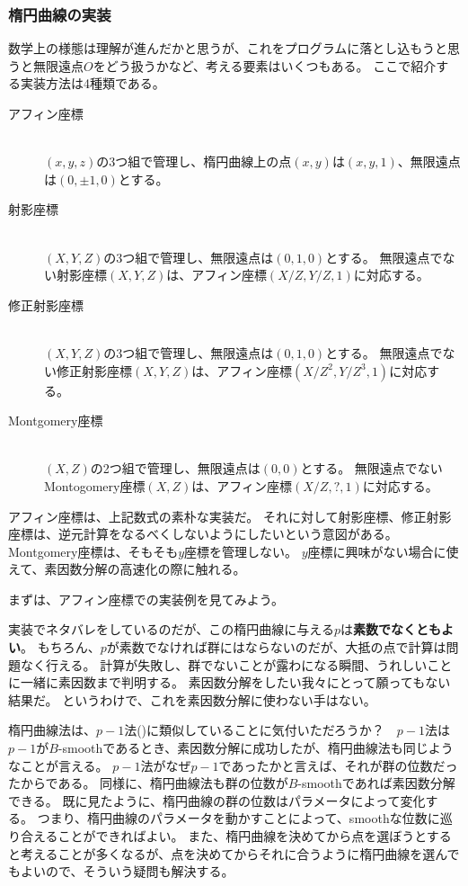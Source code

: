 \subsubsection{楕円曲線の実装}
数学上の様態は理解が進んだかと思うが、これをプログラムに落とし込もうと思うと無限遠点$O$をどう扱うかなど、考える要素はいくつもある。
ここで紹介する実装方法は4種類である。
\begin{description}
 \item [アフィン座標]\mbox{}\\
       $(x,y,z)$の3つ組で管理し、楕円曲線上の点$(x,y)$は$(x,y,1)$、無限遠点は$(0,\pm1,0)$とする。
 \item [射影座標]\mbox{}\\
       $(X,Y,Z)$の3つ組で管理し、無限遠点は$(0,1,0)$とする。
       無限遠点でない射影座標$(X,Y,Z)$は、アフィン座標$(X/Z,Y/Z,1)$に対応する。
 \item [修正射影座標]\mbox{}\\
       $(X,Y,Z)$の3つ組で管理し、無限遠点は$(0,1,0)$とする。
       無限遠点でない修正射影座標$(X,Y,Z)$は、アフィン座標$(X/Z^2,Y/Z^3,1)$に対応する。
 \item [Montgomery座標]\mbox{}\\
       $(X,Z)$の2つ組で管理し、無限遠点は$(0,0)$とする。
       無限遠点でないMontogomery座標$(X,Z)$は、アフィン座標$(X/Z,?,1)$に対応する。
\end{description}
アフィン座標は、上記数式の素朴な実装だ。
それに対して射影座標、修正射影座標は、逆元計算をなるべくしないようにしたいという意図がある。
Montgomery座標は、そもそも$y$座標を管理しない。
$y$座標に興味がない場合に使えて、素因数分解の高速化の際に触れる。

まずは、アフィン座標での実装例を見てみよう。


実装でネタバレをしているのだが、この楕円曲線に与える$p$は\textbf{素数でなくともよい}。
もちろん、$p$が素数でなければ群にはならないのだが、大抵の点で計算は問題なく行える。
計算が失敗し、群でないことが露わになる瞬間、うれしいことに一緒に素因数まで判明する。
素因数分解をしたい我々にとって願ってもない結果だ。
というわけで、これを素因数分解に使わない手はない。


楕円曲線法は、$p-1$法()に類似していることに気付いただろうか？　$p-1$法は$p-1$が$B$-smoothであるとき、素因数分解に成功したが、楕円曲線法も同じようなことが言える。
$p-1$法がなぜ$p-1$であったかと言えば、それが群の位数だったからである。
同様に、楕円曲線法も群の位数が$B$-smoothであれば素因数分解できる。
既に見たように、楕円曲線の群の位数はパラメータによって変化する。
つまり、楕円曲線のパラメータを動かすことによって、smoothな位数に巡り合えることができればよい。
また、楕円曲線を決めてから点を選ぼうとすると考えることが多くなるが、点を決めてからそれに合うように楕円曲線を選んでもよいので、そういう疑問も解決する。

